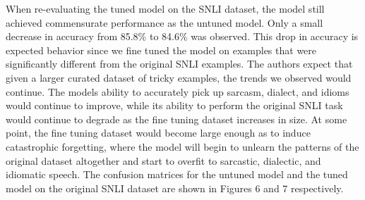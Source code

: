 \documentclass{article}
\begin{document}
When re-evaluating the tuned model on the SNLI dataset, the model still achieved commensurate performance as the untuned model.
Only a small decrease in accuracy from 85.8\% to 84.6\% was observed. This drop in accuracy is expected behavior since we fine
tuned the model on examples that were significantly different from the original SNLI examples. The authors expect that
given a larger curated dataset of tricky examples, the trends we observed would continue. The models ability to accurately
pick up sarcasm, dialect, and idioms would continue to improve, while its ability to perform the original SNLI task would
continue to degrade as the fine tuning dataset increases in size. At some point, the fine tuning dataset would become
large enough as to induce catastrophic forgetting, where the model will begin to unlearn the patterns of the original
dataset altogether and start to overfit to sarcastic, dialectic, and idiomatic speech. The confusion matrices for the
untuned model and the tuned model on the original SNLI dataset are shown in Figures 6 and 7 respectively.
\end{document}
